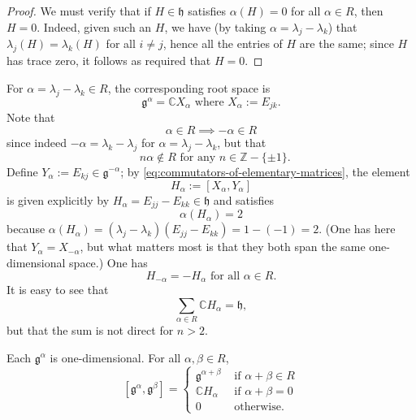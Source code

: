 \documentclass[reqno]{amsart} 
\begin{document}
\begin{proof}
  We must verify that if $H \in \mathfrak{h}$ satisfies $\alpha(H) = 0$ for all $\alpha \in R$, then $H = 0$.  Indeed, given such an $H$, we have (by taking $\alpha = \lambda_j - \lambda_k$) that $\lambda_j(H) = \lambda_k(H)$ for all $i \neq j$, hence all the entries of $H$ are the same; since $H$ has trace zero, it follows as required that $H = 0$.
\end{proof}
For $\alpha = \lambda_j - \lambda_k \in R$, the corresponding root space is
\begin{equation*}
  \mathfrak{g}^{\alpha} = \mathbb{C} X_\alpha \text{ where } X_\alpha := E_{j k}.
\end{equation*}
Note that
\begin{equation}\label{eq:negative-roots-are-roots}
  \alpha \in R \implies - \alpha \in R
\end{equation}
since indeed $-\alpha = \lambda_k - \lambda_j$ for $\alpha = \lambda_j - \lambda_k$, but that
\begin{equation*}
\text{ $n \alpha \notin R$ for any $n \in \mathbb{Z} - \{\pm 1\}$.}
\end{equation*}
Define $Y_\alpha := E_{k j} \in \mathfrak{g}^{-\alpha}$; by \eqref{eq:commutators-of-elementary-matrices}, the element
\begin{equation*}
  H_\alpha := [X_\alpha,Y_\alpha]
\end{equation*}
is given explicitly by $H_\alpha = E_{j j} - E_{k k} \in \mathfrak{h}$ and satisfies
\begin{equation*}
  \alpha(H_\alpha) = 2
\end{equation*}
because $\alpha(H_\alpha) = (\lambda_j - \lambda_k)(E_{j j} - E_{k k}) = 1 - (-1) = 2$.  (One has here that $Y_{\alpha} = X_{-\alpha}$, but what matters most is that they both span the same one-dimensional space.)  One has
\begin{equation*}
 H_{-\alpha} = - H_\alpha \text{ for all } \alpha \in R.
\end{equation*}
 It is easy to see that
\begin{equation}\label{eq:coroots-span-cartan-slNC}
  \sum_{\alpha \in R} \mathbb{C} H_\alpha = \mathfrak{h},
\end{equation}
but that the sum is not direct for $n > 2$.
\begin{lemma}\label{lem:root-space-commutation-relations}
  Each $\mathfrak{g}^{\alpha}$ is one-dimensional.  For all $\alpha,\beta \in R$,
  \begin{equation*}
    {} [\mathfrak{g}^\alpha, \mathfrak{g}^\beta]
    = 
\begin{cases}
      \mathfrak{g}^{\alpha + \beta} & \text{ if } \alpha + \beta \in R \\
      \mathbb{C} H_\alpha  & \text{ if } \alpha + \beta = 0 \\
      0 & \text{ otherwise.}
    \end{cases}
  \end{equation*}
\end{lemma}
\end{document}
